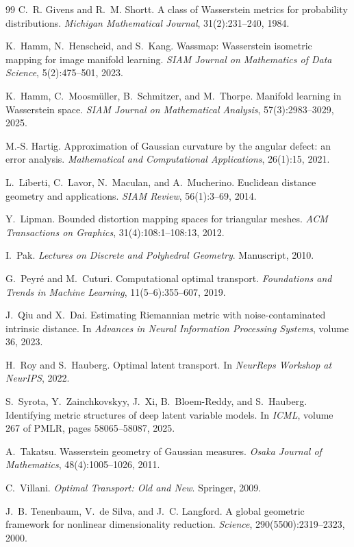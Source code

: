 \begin{thebibliography}{99}
C.~R. Givens and R.~M. Shortt.
\newblock A class of Wasserstein metrics for probability distributions.
\newblock \emph{Michigan Mathematical Journal}, 31(2):231--240, 1984.

K.~Hamm, N.~Henscheid, and S.~Kang.
\newblock Wassmap: Wasserstein isometric mapping for image manifold learning.
\newblock \emph{SIAM Journal on Mathematics of Data Science},
5(2):475--501, 2023.

K.~Hamm, C.~Moosm\"uller, B.~Schmitzer, and M.~Thorpe.
\newblock Manifold learning in Wasserstein space.
\newblock \emph{SIAM Journal on Mathematical Analysis},
57(3):2983--3029, 2025.

M.-S. Hartig.
\newblock Approximation of Gaussian curvature by the angular defect: an error
analysis.
\newblock \emph{Mathematical and Computational Applications}, 26(1):15, 2021.

L.~Liberti, C.~Lavor, N.~Maculan, and A.~Mucherino.
\newblock Euclidean distance geometry and applications.
\newblock \emph{SIAM Review}, 56(1):3--69, 2014.

Y.~Lipman.
\newblock Bounded distortion mapping spaces for triangular meshes.
\newblock \emph{ACM Transactions on Graphics}, 31(4):108:1--108:13, 2012.

I.~Pak.
\newblock \emph{Lectures on Discrete and Polyhedral Geometry}.
\newblock Manuscript, 2010.

G.~Peyr\'e and M.~Cuturi.
\newblock Computational optimal transport.
\newblock \emph{Foundations and Trends in Machine Learning},
11(5--6):355--607, 2019.

J.~Qiu and X.~Dai.
\newblock Estimating Riemannian metric with noise-contaminated intrinsic
distance.
\newblock In \emph{Advances in Neural Information Processing Systems},
volume 36, 2023.

H.~Roy and S.~Hauberg.
\newblock Optimal latent transport.
\newblock In \emph{NeurReps Workshop at NeurIPS}, 2022.

S.~Syrota, Y.~Zainchkovskyy, J.~Xi, B.~Bloem-Reddy, and S.~Hauberg.
\newblock Identifying metric structures of deep latent variable models.
\newblock In \emph{ICML}, volume 267 of PMLR, pages 58065--58087, 2025.

A.~Takatsu.
\newblock Wasserstein geometry of Gaussian measures.
\newblock \emph{Osaka Journal of Mathematics}, 48(4):1005--1026, 2011.

C.~Villani.
\newblock \emph{Optimal Transport: Old and New}.
\newblock Springer, 2009.

J.~B. Tenenbaum, V.~de Silva, and J.~C. Langford.
\newblock A global geometric framework for nonlinear dimensionality reduction.
\newblock \emph{Science}, 290(5500):2319--2323, 2000.

\end{thebibliography}
